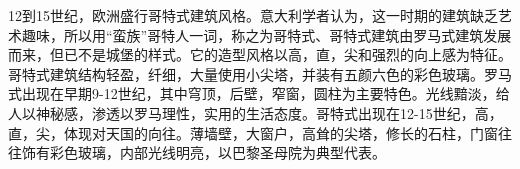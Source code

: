 12到15世纪，欧洲盛行哥特式建筑风格。意大利学者认为，这一时期的建筑缺乏艺术趣味，所以用“蛮族”哥特人一词，称之为哥特式、哥特式建筑由罗马式建筑发展而来，但已不是城堡的样式。它的造型风格以高，直，尖和强烈的向上感为特征。哥特式建筑结构轻盈，纤细，大量使用小尖塔，并装有五颜六色的彩色玻璃。罗马式出现在早期9-12世纪，其中穹顶，后壁，窄窗，圆柱为主要特色。光线黯淡，给人以神秘感，渗透以罗马理性，实用的生活态度。哥特式出现在12-15世纪，高，直，尖，体现对天国的向往。薄墙壁，大窗户，高耸的尖塔，修长的石柱，门窗往往饰有彩色玻璃，内部光线明亮，以巴黎圣母院为典型代表。

